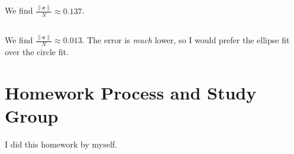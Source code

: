 \documentclass[]{article}
\renewcommand{\vec}[1]{\bm{#1}}
\begin{document}
\subsection{}

We find \(\frac{\|\vec{e}\|}{N} \approx 0.137\). 

\subsection{}

We find \(\frac{\|\vec{e}\|}{N} \approx 0.013\). 
The error is \emph{much} lower, so I would prefer the ellipse fit over the circle fit. 

\section{Homework Process and Study Group}

I did this homework by myself. 

\newpage


\end{document}
